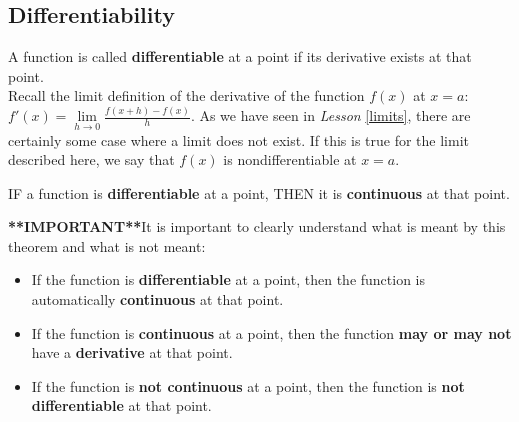 

\subsection*{Differentiability}%
A function is called \textbf{differentiable} at a point if its derivative exists at that point.\\
\noindent Recall the limit definition of the derivative of the function $f(x)$ at $x=a$:  $f'(x)=\lim\limits_{h \to 0} \displaystyle\frac{f(x+h)-f(x)}{h}$. As we have seen in \emph{Lesson} \ref{limits}, there are certainly some case where a limit does not exist. If this is true for the limit described here, we say that $f(x)$ is nondifferentiable at $x=a$.\\
\vspace{-0.4cm}
\begin{tcolorbox}[title = {Theorem:}]
\begin{center}
IF a function is \textbf{differentiable} at a point, THEN it is \textbf{continuous} at that point.
\end{center}
\end{tcolorbox}


\noindent \textbf{**IMPORTANT**}It is important to clearly understand what is meant by this theorem and what is not meant: 
\begin{itemize}[leftmargin=*]
    \item If the function is \textbf{differentiable} at a point, then the function is automatically \textbf{continuous} at that point.
    \item If the function is \textbf{continuous} at a point, then the function \textbf{may or may not} have a \textbf{derivative} at that point.
    \item If the function is \textbf{not continuous} at a point, then the function is \textbf{not differentiable} at that point.
\end{itemize}

